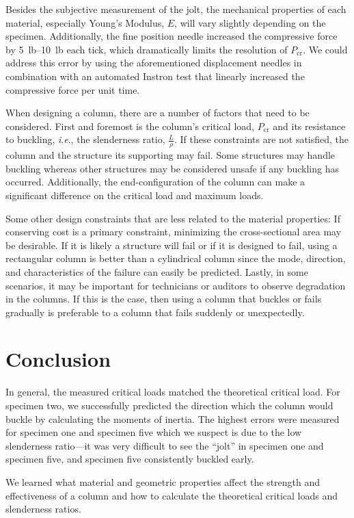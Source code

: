 \documentclass[12 pt]{article}
\newcommand{\ie}{\textit{i}.\textit{e}., }
\begin{document}
Besides the subjective measurement of the jolt, the mechanical properties of each material, especially Young's Modulus, $E$, will vary slightly depending on the specimen. Additionally, the fine position needle increased the compressive force by \qtyrange{5}{10}{lb} each tick, which dramatically limits the resolution of $P_\text{cr}$. We could address this error by using the aforementioned displacement needles in combination with an automated Instron test that linearly increased the compressive force per unit time.


When designing a column, there are a number of factors that need to be considered. First and foremost is the column's critical load, $P_\text{cr}$ and its resistance to buckling, \ie the slenderness ratio, $\frac{L}{\rho}$. If these constraints are not satisfied, the column and the structure its supporting may fail. Some structures may handle buckling whereas other structures may be considered unsafe if any buckling has occurred. Additionally, the end-configuration of the column can make a significant difference on the critical load and maximum loads.

Some other design constraints that are less related to the material properties: If conserving cost is a primary constraint, minimizing the cross-sectional area may be desirable. If it is likely a structure will fail or if it is designed to fail, using a rectangular column is better than a cylindrical column since the mode, direction, and characteristics of the failure can easily be predicted. Lastly, in some scenarios, it may be important for technicians or auditors to observe degradation in the columns. If this is the case, then using a column that buckles or fails gradually is preferable to a column that fails suddenly or unexpectedly.

\section{Conclusion} \label{conclusion}
In general, the measured critical loads matched the theoretical critical load. For specimen two, we successfully predicted the direction which the column would buckle by calculating the moments of inertia. The highest errors were measured for specimen one and specimen five which we suspect is due to the low slenderness ratio---it was very difficult to see the ``jolt'' in specimen one and specimen five, and specimen five consistently buckled early.

We learned what material and geometric properties affect the strength and effectiveness of a column and how to calculate the theoretical critical loads and slenderness ratios.
\end{document}
